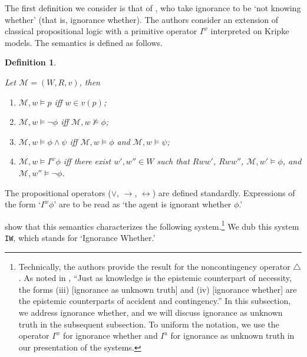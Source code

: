 \documentclass{article}
\newtheorem{defi}{Definition}
\begin{document}
The first definition we consider is that of \citet{Hoek2004}, who take ignorance to be `not knowing whether' (that is, ignorance whether). The authors consider an extension of classical propositional logic with a primitive operator $I^{w}$ interpreted on Kripke models. The semantics is defined as follows.

\begin{defi}
\label{defSemIwhether}

Let $\mathcal{M} = (W, R, v)$, then

\begin{enumerate}


\item $\mathcal{M}, w \models p$ iff $w \in v(p)$;

\item $\mathcal{M}, w \models \neg \phi$ iff $\mathcal{M}, w \not \models \phi$;

\item $\mathcal{M}, w \models \phi \wedge \psi$ iff $\mathcal{M}, w \models \phi$ and $\mathcal{M}, w \models \psi$;

\item $\mathcal{M}, w \models I^{w} \phi$ iff there exist $w', w'' \in W$ such that $Rww'$, $Rww''$, $\mathcal{M}, w' \models \phi$, and $\mathcal{M}, w'' \models \neg \phi$.

\end{enumerate}

\end{defi}

The propositional operators ($\vee$, $\rightarrow$, $\leftrightarrow$) are defined standardly. Expressions of the form `$I^{w}\phi$' are to be read as `the agent is ignorant whether $\phi$.' 

\citet{Fan2015} show that this semantics characterizes the following system.\footnote{Technically, the authors provide the result for the noncontingency operator $\triangle$. As noted in \citep[p. 1295]{Fan2021}, ``Just as knowledge is the epistemic counterpart of necessity, the forms (iii) [ignorance as unknown truth] and (iv) [ignorance whether] are the epistemic counterparts of accident and contingency.'' In this subsection, we address ignorance whether, and we will discuss ignorance as unknown truth in the subsequent subsection. To uniform the notation, we use the operator $I^{w}$ for ignorance whether and $I^{u}$ for ignorance as unknown truth in our presentation of the systems.} We dub this system \texttt{IW}, which stands for `Ignorance Whether.'
\end{document}
